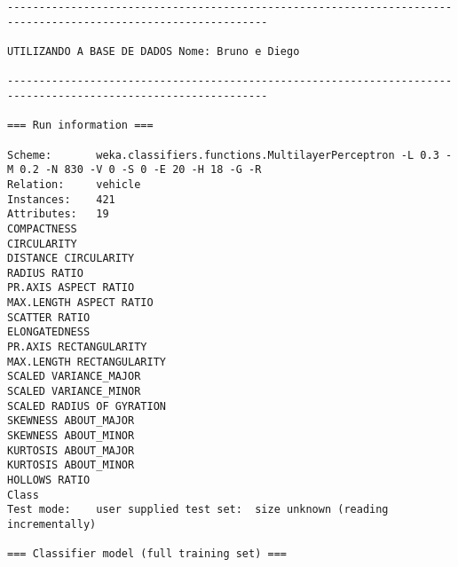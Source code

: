 \documentclass[
	article,			%
	11pt,				%
	oneside,			%
	a4paper,			%
	english,			%
	brazil,				%
	sumario=tradicional
	]{abntex2}
\begin{document}
\begin{lstlisting}
---------------------------------------------------------------------------------------------------------------

UTILIZANDO A BASE DE DADOS Nome: Bruno e Diego

---------------------------------------------------------------------------------------------------------------

=== Run information ===

Scheme:       weka.classifiers.functions.MultilayerPerceptron -L 0.3 -M 0.2 -N 830 -V 0 -S 0 -E 20 -H 18 -G -R
Relation:     vehicle
Instances:    421
Attributes:   19
COMPACTNESS
CIRCULARITY
DISTANCE CIRCULARITY
RADIUS RATIO
PR.AXIS ASPECT RATIO
MAX.LENGTH ASPECT RATIO
SCATTER RATIO
ELONGATEDNESS
PR.AXIS RECTANGULARITY
MAX.LENGTH RECTANGULARITY
SCALED VARIANCE_MAJOR
SCALED VARIANCE_MINOR
SCALED RADIUS OF GYRATION
SKEWNESS ABOUT_MAJOR
SKEWNESS ABOUT_MINOR
KURTOSIS ABOUT_MAJOR
KURTOSIS ABOUT_MINOR
HOLLOWS RATIO
Class
Test mode:    user supplied test set:  size unknown (reading incrementally)

=== Classifier model (full training set) ===


\end{lstlisting}
\end{document}
